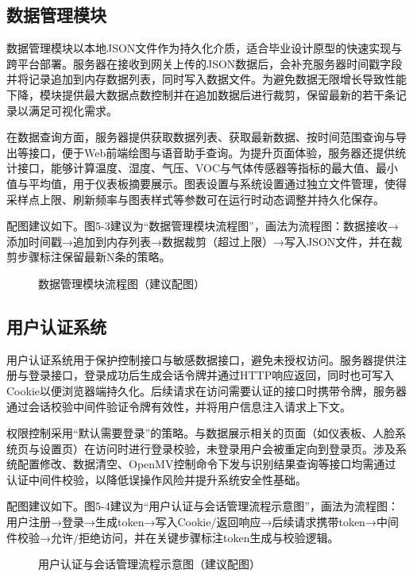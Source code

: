 \subsection{数据管理模块}
\par 数据管理模块以本地JSON文件作为持久化介质，适合毕业设计原型的快速实现与跨平台部署。服务器在接收到网关上传的JSON数据后，会补充服务器时间戳字段并将记录追加到内存数据列表，同时写入数据文件。为避免数据无限增长导致性能下降，模块提供最大数据点数控制并在追加数据后进行裁剪，保留最新的若干条记录以满足可视化需求。
\par 在数据查询方面，服务器提供获取数据列表、获取最新数据、按时间范围查询与导出等接口，便于Web前端绘图与语音助手查询。为提升页面体验，服务器还提供统计接口，能够计算温度、湿度、气压、VOC与气体传感器等指标的最大值、最小值与平均值，用于仪表板摘要展示。图表设置与系统设置通过独立文件管理，使得采样点上限、刷新频率与图表样式等参数可在运行时动态调整并持久化保存。

\par 配图建议如下。图5-3建议为“数据管理模块流程图”，画法为流程图：数据接收→添加时间戳→追加到内存列表→数据裁剪（超过上限）→写入JSON文件，并在裁剪步骤标注保留最新N条的策略。
\begin{figure}[H]
\centering
{}
\caption{数据管理模块流程图（建议配图）}
\label{fig:data_flow_server}
\end{figure}

\subsection{用户认证系统}
\par 用户认证系统用于保护控制接口与敏感数据接口，避免未授权访问。服务器提供注册与登录接口，登录成功后生成会话令牌并通过HTTP响应返回，同时也可写入Cookie以便浏览器端持久化。后续请求在访问需要认证的接口时携带令牌，服务器通过会话校验中间件验证令牌有效性，并将用户信息注入请求上下文。
\par 权限控制采用“默认需要登录”的策略。与数据展示相关的页面（如仪表板、人脸系统页与设置页）在访问时进行登录校验，未登录用户会被重定向到登录页。涉及系统配置修改、数据清空、OpenMV控制命令下发与识别结果查询等接口均需通过认证中间件校验，以降低误操作风险并提升系统安全性基础。

\par 配图建议如下。图5-4建议为“用户认证与会话管理流程示意图”，画法为流程图：用户注册→登录→生成token→写入Cookie/返回响应→后续请求携带token→中间件校验→允许/拒绝访问，并在关键步骤标注token生成与校验逻辑。
\begin{figure}[H]
\centering
{}
\caption{用户认证与会话管理流程示意图（建议配图）}
\label{fig:auth_flow}
\end{figure}


